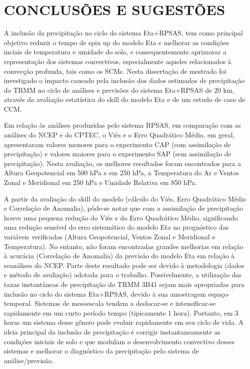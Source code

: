 \hypertarget{estilo:capitulo}{}
\chapter{CONCLUSÕES E SUGESTÕES}
\label{ss:cap5}

A inclusão da precipitação no ciclo do sistema Eta+RPSAS, tem como principal objetivo reduzir o tempo de spin up do modelo Eta e melhorar as condições inciais de temperatura e umidade do solo, e consequentemente aprimorar a representação dos sistemas convectivos, especialmente aqueles relacionados à convecção profunda, tais como os SCMs. Nesta dissertação de mestrado foi investigado o impacto causado pela inclusão dos dados estimados de precipitação do TRMM no ciclo de análises e previsões do sistema Eta+RPSAS de 20 km, através da avaliação estatística do skill do modelo Eta e de um estudo de caso de CCM.

Em relação às análises produzidas pelo sistema RPSAS, em comparação com as análises do NCEP e do CPTEC, o Viés e o Erro Quadrático Médio, em geral,  apresentaram valores menores para o experimento CAP (com assimilação de precipitação) e valores maiores para o experimento SAP (sem assimilação de precipitação). Nesta avaliação, os melhores resultados foram encontrados para
a Altura Geopotencial em 500 hPa e em 250 hPa, a Temperatura do Ar e Ventos Zonal e Meridional em 250 hPa e Umidade Relativa em 850 hPa.

A partir da avaliação do skill do modelo (cálculo do Viés, Erro Quadrático Médio e Correlação de Anomalia), pôde-se notar que com a assimilação de precipitação houve uma pequena redução do Viés e do Erro Quadrático Médio, significando uma redução sensível do erro sistemático do modelo Eta no prognóstico das variáveis verificadas (Altura Geopotencial, Ventos Zonal e Meridional e Temperatura). No entanto, não foram encontradas grandes melhorias em relação à acurácia (Correlação de Anomalia) da previsão do modelo Eta em relação à reanálises do NCEP. Parte deste resultado pode ser devido à metodologia (dados e método de avaliação) adotada para o trabalho.  Possivelmente, a utilização das taxas instantâneas de precipitação do TRMM 3B41 sejam mais apropriadas para inclusão no ciclo do sistema Eta+RPSAS, devido à sua amostragem espaço-temporal. Sistemas de mesoescala tendem a deslocar-se e intensificar-se rapidamente em um curto período tempo (tipicamente 1 hora). Portanto, em 3 horas um sistema desse gênero pode evoluir rapidamente em seu ciclo de vida. A ideia principal da inclusão de precipitação é corrigir instantaneamente as condições iniciais de solo e que modulam o desenvolvimento convectivo desses sistemas e melhorar o diagnóstico da precipitação pelo sistema de análise/previsão.

